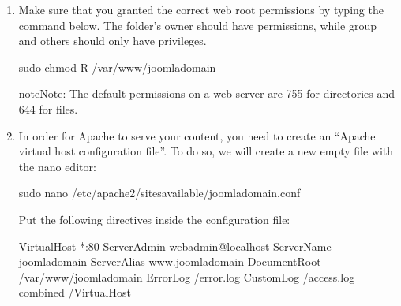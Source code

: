 \documentclass[a4paper,10pt,english,openany,oneside]{sphinxmanual}
\begin{document}
\begin{sloppypar}
\begin{enumerate}
\begin{sphinxVerbatim}[commandchars=\\\{\}]
\PYGZdl{} sudo chown \PYGZhy{}R : /var/www/joomla\PYGZhy{}domain
\end{sphinxVerbatim}

\item {} 
\sphinxAtStartPar
Make sure that you granted the correct web root permissions by typing the command below. The folder’s owner should have  permissions, while group and others should only have  privileges.

\begin{sphinxVerbatim}[commandchars=\\\{\}]
\PYGZdl{} sudo chmod \PYGZhy{}R  /var/www/joomla\PYGZhy{}domain
\end{sphinxVerbatim}

\begin{sphinxadmonition}{note}{Note:}
\sphinxAtStartPar
The default permissions on a web server are 755 for directories and 644 for files.
\end{sphinxadmonition}

\item {} 
\sphinxAtStartPar
In order for Apache to serve your content, you need to create an “Apache virtual host configuration file”. To do so, we will create a new empty file with the nano editor:

\begin{sphinxVerbatim}[commandchars=\\\{\}]
\PYGZdl{} sudo nano /etc/apache2/sites\PYGZhy{}available/joomla\PYGZhy{}domain.conf
\end{sphinxVerbatim}

\sphinxAtStartPar
Put the following directives inside the configuration file:

\begin{sphinxVerbatim}[commandchars=\\\{\},numbers=left,firstnumber=1,stepnumber=1]
\PYGZlt{}VirtualHost *:80\PYGZgt{}
ServerAdmin webadmin@localhost
ServerName joomla\PYGZhy{}domain
ServerAlias www.joomla\PYGZhy{}domain
DocumentRoot /var/www/joomla\PYGZhy{}domain
ErrorLog /error.log
CustomLog /access.log combined
\PYGZlt{}/VirtualHost\PYGZgt{}
\end{sphinxVerbatim}


\end{enumerate}
\end{sloppypar}
\end{document}
